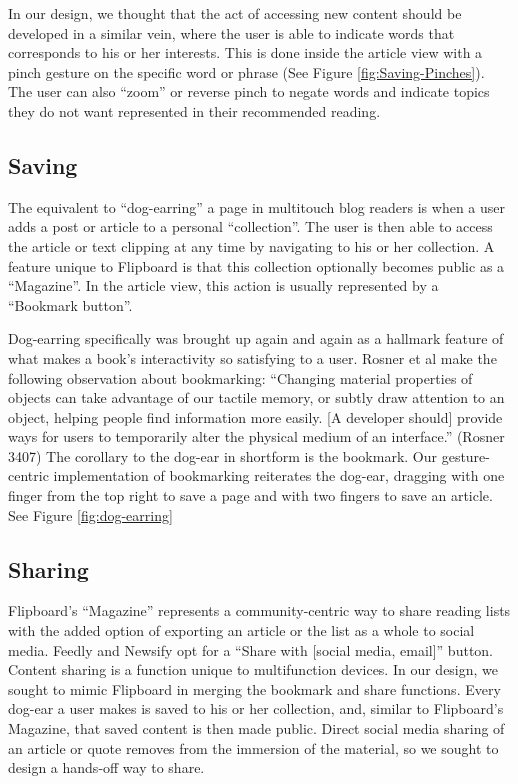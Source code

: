 \documentclass[11pt, oneside]{article}   	%
\begin{document}
In our design, we thought that the act of accessing new content  should be developed in a similar vein, where the user is able to indicate words that corresponds to his or her interests. This is done inside the article view with a pinch gesture on the specific word or phrase (See Figure \ref{fig:Saving-Pinches}). The user can also ``zoom'' or reverse pinch to negate words and indicate topics they do not want represented in their recommended reading.

\subsection{Saving}
The equivalent to ``dog-earring''  a page in multitouch blog readers is when a user adds a post or article to a personal ``collection''. The user is then able to access the article or text clipping at any time by navigating to his or her collection. A feature unique to Flipboard is that this collection optionally becomes public as a ``Magazine''. In the article view, this action is usually represented by a ``Bookmark button''.


Dog-earring specifically was brought up again and again as a hallmark feature of what makes a book's interactivity so satisfying to a user. Rosner et al make the following observation about bookmarking: ``Changing material properties of objects can take advantage of our tactile memory, or subtly draw attention to an object, helping people find information more easily. [A developer should] provide ways for users to temporarily alter the physical medium of an interface.'' (Rosner 3407) The corollary to the dog-ear in shortform is the bookmark. Our gesture-centric implementation of bookmarking reiterates the dog-ear, dragging with one finger from the top right to save a page and with two fingers to save an article. See Figure \ref{fig:dog-earring}

\subsection{Sharing}
Flipboard's ``Magazine'' represents a community-centric way to share reading lists with the added option of exporting an article or the list as a whole to social media. Feedly and Newsify opt for a ``Share with [social media, email]'' button. Content sharing is a function unique to multifunction devices. In our design, we sought to mimic Flipboard in merging the bookmark and share functions. Every dog-ear a user makes is saved to his or her collection, and, similar to Flipboard's Magazine, that saved content is then made public. Direct social media sharing of an article or quote removes from the immersion of the material, so we sought to design a hands-off way to share.
\end{document}
